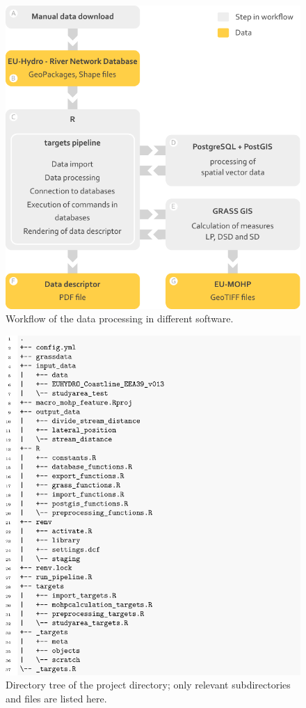 \documentclass[fleqn,10pt]{wlscirep}
\begin{document}
\normalsize

\small

\begin{figure}[H]

{\centering \includegraphics[width=0.7\linewidth]{data_descriptor/tex/workflow_figure} 

}

\caption{Workflow of the data processing in different software.}\label{fig:workflowfigure}
\end{figure}

\normalsize

\small

\begin{figure}[H]

{\centering \includegraphics[width=0.7\linewidth]{data_descriptor/tex/directory_tree} 

}

\caption{Directory tree of the project directory; only relevant subdirectories and files are listed here.}\label{fig:projectdirtree}
\end{figure}
\end{document}
